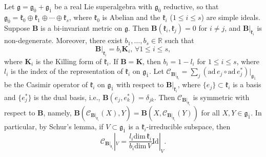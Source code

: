 \documentclass[reqno]{amsart}
\theoremstyle{definition}
\begin{document}
Let $\mathfrak{g}=\mathfrak{g}_{\bar{0}}+\mathfrak{g}_{\bar{1}}$ be a real Lie superalgebra with $\mathfrak{g}_{\bar{0}}$ reductive,  so that $\mathfrak{g}_{\bar{0}}=\mathfrak{k}_{0}\oplus\mathfrak{k}_{1}\oplus\cdots\oplus\mathfrak{k}_{s}$, where $\mathfrak{k}_{0}$ is Abelian and the $\mathfrak{k}_{i}$ ($1\leq i\leq s$) are simple ideals.
Suppose $\mathbf{B}$ is a bi-invariant metric on $\mathfrak{g}$. Then
 $\mathbf{B}(\mathfrak{k}_{i},\mathfrak{k}_{j})=0$ for $i\neq j$,  and $\mathbf{B}|_{\mathfrak{k}_{i}}$ is non-degenerate.
Moreover,  there exist $b_{1},\ldots,b_{s}\in\mathbb{R}$ such that
$$\mathbf{B}|_{\mathfrak{k}_{i}}=b_{i}\mathbf{K}_{i}, \, \forall 1\leq i \leq s,$$
 where $\mathbf{K}_{i}$  is the Killing form of $\mathfrak{k}_{i}$.
 If $\mathbf{B}=\mathbf{K}$, then $b_{i}=1-l_{i}$ for $1\leq i \leq s$, where $l_{i}$ is the index of the representation of $\mathfrak{k}_{i}$ on $\mathfrak{g}_{\bar{1}}$.
 Let $\mathcal{C}_{\mathbf{B}|_{\mathfrak{k}_{i}}}=\sum\limits_{j}(\mathrm{ad}\,e_{j}\circ\mathrm{ad}\,e_{j}^{\ast})|_{\mathfrak{g}_{\bar{1}}}$ be the Casimir operator of $\mathfrak{k}_{i}$ on $\mathfrak{g}_{\bar{1}}$ with respect to $\mathbf{B}|_{\mathfrak{k}_{i}}$, where $\{e_{j}\}\subset \mathfrak{k}_{i}$ is a basis and $\{e_{j}^{\ast}\}$ is the dual basis, i.e., $\mathbf{B}(e_{j},e_{k}^{\ast})=\delta_{jk}$.
Then  $\mathcal{C}_{\mathbf{B}|_{\mathfrak{k}_{i}}}$ is symmetric with respect to $\mathbf{B}$, namely,
$\mathbf{B}(\mathcal{C}_{\mathbf{B}|_{\mathfrak{k}_{i}}}(X),Y)
=\mathbf{B}(X,\mathcal{C}_{\mathbf{B}|_{\mathfrak{k}_{i}}}(Y))$ for all $X,Y\in \mathfrak{g}_{\bar{1}}$.
In particular, by Schur's lemma,  if $V\subset \mathfrak{g}_{\bar{1}}$ is a $\mathfrak{k}_{i}$-irreducible subspace,  then
$$\mathcal{C}_{\mathbf{B}|_{\mathfrak{k}_{i}}}|_{V}
=\frac{l_{i}\mathrm{dim}\,\mathfrak{k}_{i}}{b_{i}\mathrm{dim}\,V}\mathrm{Id}|_{V}.$$
\end{document}
